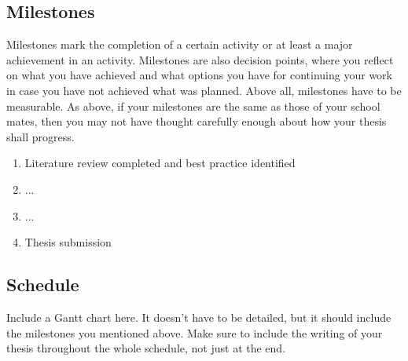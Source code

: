 \documentclass[master]{thesis_proposal}
\begin{document}
\subsection{Milestones}
Milestones mark the completion of a certain activity or at least a major achievement in an activity. Milestones are also decision points, where you reflect on what you have achieved and what options you have for continuing your work in case you have not achieved what was planned. Above all, milestones have to be measurable. As above, if your milestones are the same as those of your school mates, then you may not have thought carefully enough about how your thesis shall progress.
\begin{enumerate}
    \item[M1] Literature review completed and best practice identified
    \item[M2] ...
    \item[M3] ...
    \item[M4] Thesis submission
\end{enumerate}

\subsection{Schedule}
Include a Gantt chart here. It doesn't have to be detailed, but it should include the milestones you mentioned above.
Make sure to include the writing of your thesis throughout the whole schedule, not just at the end.
\end{document}
